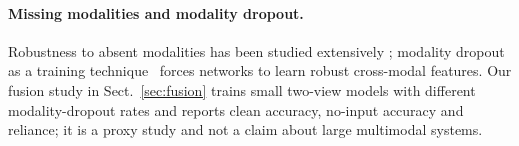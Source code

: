 \paragraph{Missing modalities and modality dropout.}
Robustness to absent modalities has been studied extensively
\cite{ma2022missing}; modality dropout as a training
technique~\cite{neverova2016moddrop} forces networks to learn robust
cross-modal features.
Our fusion study in Sect.~\ref{sec:fusion} trains small two-view models
with different modality-dropout rates and reports clean accuracy,
no-input accuracy and reliance; it is a proxy study and not a claim about
large multimodal systems.
